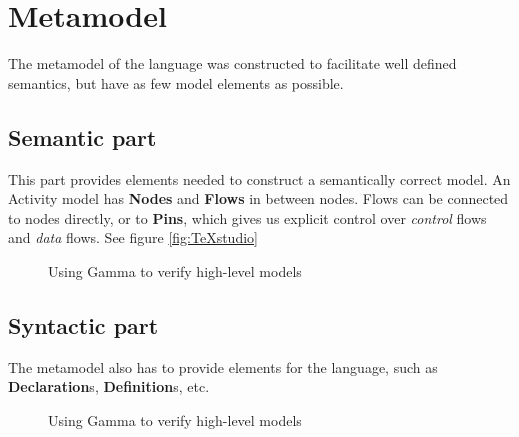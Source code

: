 \clearpage\section{Metamodel}

The metamodel of the language was constructed to facilitate well defined semantics, but have as few model elements as possible.

\subsection{Semantic part}

This part provides elements needed to construct a semantically correct model. An Activity model has \textbf{Nodes} and \textbf{Flows} in between nodes. Flows can be connected to nodes directly, or to \textbf{Pins}, which gives us explicit control over \emph{control} flows and \emph{data} flows. See figure \ref{fig:TeXstudio}

\begin{figure}[!ht]
	\centering
	
	\caption{Using Gamma to verify high-level models}
	\label{fig:semantic}
\end{figure}

\subsection{Syntactic part}

The metamodel also has to provide elements for the language, such as \textbf{Declaration}s, \textbf{Definition}s, etc.

\begin{figure}[!ht]
	\centering
	
	\caption{Using Gamma to verify high-level models}
	\label{fig:syntactic}
\end{figure}
